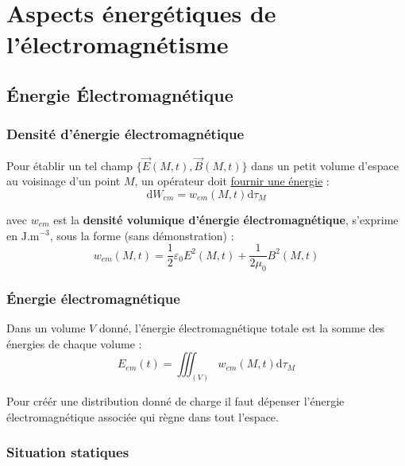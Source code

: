 \chapter{Aspects énergétiques de l'électromagnétisme}

\section{Énergie Électromagnétique} %
\label{sec:Énergie Électromagnétique}

\subsection{Densité d'énergie électromagnétique} %
\label{sub:Densité d'énergie électromagnétique}

Pour établir un tel champ $\{ \overrightarrow{E}(M,t), \overrightarrow{B}(M,t)\}$ dans un petit volume d'espace au voisinage d'un point $M$, un opérateur doit \underline{fournir une énergie} : 
\begin{equation}
  \mathrm{d} W _{em}  = w _{em}(M,t) \mathrm{d}\tau_M
\end{equation}

avec $w _{em}$ est la \textbf{densité volumique d'énergie électromagnétique}, s'exprime en $\mathrm{J}. \mathrm{m} ^{-3}$, sous la forme (sans démonstration) : 
\begin{equation}
\boxed{ w _{em}(M,t) = \frac{1}{2}  \varepsilon_0 E ^{2}(M,t) + \frac{1}{2 \mu_0} B ^{2}(M,t)}
\end{equation}

\subsection{Énergie électromagnétique} %
\label{sub:Énergie électromagnétique}

Dans un volume $V$ donné, l'énergie électromagnétique totale est la somme des énergies de chaque volume : 
\begin{equation}
  \boxed{ E _{em}(t) = \iiint _{(V)} w _{em}(M,t) \mathrm{d}\tau_M}
\end{equation}

Pour créér une distribution donné de charge il faut dépenser l'énergie électromagnétique associée qui règne dans tout l'espace.

\subsection{Situation statiques} %
\label{sub:Situation statiques}

